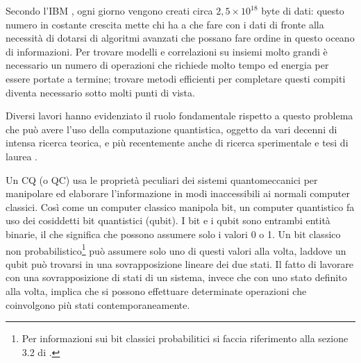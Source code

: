 
Secondo l'IBM \cite{ibm-big-data}, ogni giorno vengono creati circa $2,5\times10^{18}$ byte di dati: 
questo numero in costante crescita mette chi ha a che fare con i dati di fronte 
alla necessità di dotarsi di algoritmi avanzati che possano fare ordine in questo 
oceano di informazioni. Per trovare modelli e correlazioni su insiemi molto grandi
è necessario un numero di operazioni che richiede molto tempo ed 
energia per essere portate a termine; trovare metodi efficienti per completare 
questi compiti diventa necessario sotto molti punti di vista. 

Diversi lavori hanno evidenziato il ruolo fondamentale rispetto a questo problema 
che può avere l'uso della computazione quantistica, 
oggetto da vari decenni di intensa ricerca teorica, 
e più recentemente anche di ricerca sperimentale \cite{schuld} e tesi di laurea \cite{fingerhuth}. 

Un \ac{CQ} (o \ac{QC}) usa le proprietà peculiari dei sistemi quantomeccanici per manipolare 
ed elaborare l'informazione in modi inaccessibili ai normali computer classici. 
Così come un computer classico manipola bit, un computer quantistico fa uso dei 
cosiddetti bit quantistici (qubit). I bit e i qubit sono entrambi entità binarie, 
il che significa che possono assumere solo i valori 0 o 1. 
Un bit classico non probabilistico\footnote{Per informazioni sui bit classici 
probabilitici si faccia riferimento alla sezione 3.2 di \cite{mannucci}.} 
può assumere solo uno di questi valori alla volta, 
laddove un qubit può trovarsi in una sovrapposizione lineare dei due stati. 
Il fatto di lavorare con una sovrapposizione di stati di un sistema, 
invece che con uno stato definito alla volta, implica che si possono effettuare 
determinate operazioni che coinvolgono più stati contemporaneamente. 

